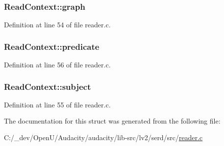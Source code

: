 \subsubsection[{\texorpdfstring{graph}{graph}}]{ Read\+Context\+::graph}\hypertarget{struct_read_context_a709b5a59c90f78414910f39045fd75e5}{}\label{struct_read_context_a709b5a59c90f78414910f39045fd75e5}


Definition at line 54 of file reader.\+c.

\subsubsection[{\texorpdfstring{predicate}{predicate}}]{ Read\+Context\+::predicate}\hypertarget{struct_read_context_afc93d6c14a830fbd358031bf6af40679}{}\label{struct_read_context_afc93d6c14a830fbd358031bf6af40679}


Definition at line 56 of file reader.\+c.

\subsubsection[{\texorpdfstring{subject}{subject}}]{ Read\+Context\+::subject}\hypertarget{struct_read_context_af01726bf3cdcea0c7d9181780c0f9792}{}\label{struct_read_context_af01726bf3cdcea0c7d9181780c0f9792}


Definition at line 55 of file reader.\+c.



The documentation for this struct was generated from the following file\+:\begin{DoxyCompactItemize}
\item 
C\+:/\+\_\+dev/\+Open\+U/\+Audacity/audacity/lib-\/src/lv2/serd/src/\hyperlink{reader_8c}{reader.\+c}\end{DoxyCompactItemize}
